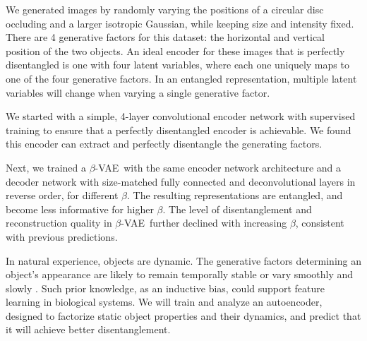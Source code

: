 \documentclass[10pt,letterpaper]{article}
\newcommand{\bvae}{$\beta$-VAE~}
\begin{document}


We generated images by randomly varying the positions of a circular disc occluding and a larger isotropic Gaussian, while keeping size and intensity fixed. There are 4 generative factors for this dataset: the horizontal and vertical position of the two objects. An ideal encoder for these images that is perfectly disentangled is one with four latent variables, where each one uniquely maps to one of the four generative factors. In an entangled representation, multiple latent variables will change when varying a single generative factor.

We started with a simple, 4-layer convolutional encoder network with supervised training to ensure that a perfectly disentangled encoder is achievable. We found this encoder can extract and perfectly disentangle the generating factors.

Next, we trained a \bvae with the same encoder network architecture and a decoder network with size-matched fully connected and deconvolutional layers in reverse order, for different $\beta$. The resulting representations are entangled, and become less informative for higher $\beta$. The level of disentanglement and reconstruction quality in \bvae further declined with increasing $\beta$, consistent with previous predictions.

In natural experience, objects are dynamic. The generative factors determining an object's appearance are likely to remain temporally stable or vary smoothly and slowly \cite{Wiskott2002}. Such prior knowledge, as an inductive bias, could support feature learning in biological systems. We will train and analyze an autoencoder, designed to factorize static object properties and their dynamics, and predict that it will achieve better disentanglement.

\bigskip



\setlength{\bibleftmargin}{.125in}
\setlength{\bibindent}{-\bibleftmargin}

\end{document}
